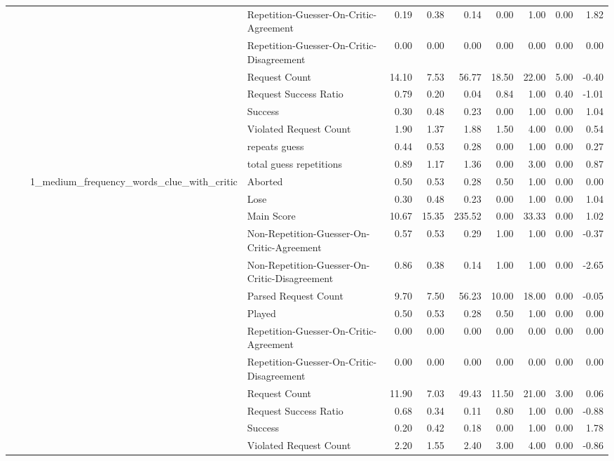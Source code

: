 \begin{tabular}{llllrrrrrrr}
 &  &  & Repetition-Guesser-On-Critic-Agreement & 0.19 & 0.38 & 0.14 & 0.00 & 1.00 & 0.00 & 1.82 \\
 &  &  & Repetition-Guesser-On-Critic-Disagreement & 0.00 & 0.00 & 0.00 & 0.00 & 0.00 & 0.00 & 0.00 \\
 &  &  & Request Count & 14.10 & 7.53 & 56.77 & 18.50 & 22.00 & 5.00 & -0.40 \\
 &  &  & Request Success Ratio & 0.79 & 0.20 & 0.04 & 0.84 & 1.00 & 0.40 & -1.01 \\
 &  &  & Success & 0.30 & 0.48 & 0.23 & 0.00 & 1.00 & 0.00 & 1.04 \\
 &  &  & Violated Request Count & 1.90 & 1.37 & 1.88 & 1.50 & 4.00 & 0.00 & 0.54 \\
 &  &  & repeats guess & 0.44 & 0.53 & 0.28 & 0.00 & 1.00 & 0.00 & 0.27 \\
 &  &  & total guess repetitions & 0.89 & 1.17 & 1.36 & 0.00 & 3.00 & 0.00 & 0.87 \\
\cline{3-11}
 &  & \multirow[t]{15}{*}{1_medium_frequency_words_clue_with_critic} & Aborted & 0.50 & 0.53 & 0.28 & 0.50 & 1.00 & 0.00 & 0.00 \\
 &  &  & Lose & 0.30 & 0.48 & 0.23 & 0.00 & 1.00 & 0.00 & 1.04 \\
 &  &  & Main Score & 10.67 & 15.35 & 235.52 & 0.00 & 33.33 & 0.00 & 1.02 \\
 &  &  & Non-Repetition-Guesser-On-Critic-Agreement & 0.57 & 0.53 & 0.29 & 1.00 & 1.00 & 0.00 & -0.37 \\
 &  &  & Non-Repetition-Guesser-On-Critic-Disagreement & 0.86 & 0.38 & 0.14 & 1.00 & 1.00 & 0.00 & -2.65 \\
 &  &  & Parsed Request Count & 9.70 & 7.50 & 56.23 & 10.00 & 18.00 & 0.00 & -0.05 \\
 &  &  & Played & 0.50 & 0.53 & 0.28 & 0.50 & 1.00 & 0.00 & 0.00 \\
 &  &  & Repetition-Guesser-On-Critic-Agreement & 0.00 & 0.00 & 0.00 & 0.00 & 0.00 & 0.00 & 0.00 \\
 &  &  & Repetition-Guesser-On-Critic-Disagreement & 0.00 & 0.00 & 0.00 & 0.00 & 0.00 & 0.00 & 0.00 \\
 &  &  & Request Count & 11.90 & 7.03 & 49.43 & 11.50 & 21.00 & 3.00 & 0.06 \\
 &  &  & Request Success Ratio & 0.68 & 0.34 & 0.11 & 0.80 & 1.00 & 0.00 & -0.88 \\
 &  &  & Success & 0.20 & 0.42 & 0.18 & 0.00 & 1.00 & 0.00 & 1.78 \\
 &  &  & Violated Request Count & 2.20 & 1.55 & 2.40 & 3.00 & 4.00 & 0.00 & -0.86 \\

\end{tabular}
